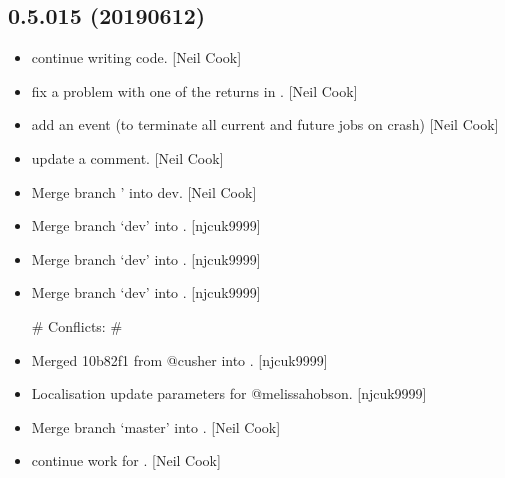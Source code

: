 \documentclass[a4paper,10pt,english]{report}
\begin{document}
\subsection{0.5.015 (2019\sphinxhyphen{}06\sphinxhyphen{}12)}
\label{\detokenize{misc/changelog:id141}}\begin{itemize}
\item {} 
 \sphinxhyphen{} continue writing code. {[}Neil Cook{]}

\item {} 
 \sphinxhyphen{} fix a problem with one of the returns in
. {[}Neil Cook{]}

\item {} 
 \sphinxhyphen{} add an event (to terminate all current and
future jobs on crash) {[}Neil Cook{]}

\item {} 
 \sphinxhyphen{} update a comment. {[}Neil Cook{]}

\item {} 
Merge branch ’ into dev. {[}Neil Cook{]}

\item {} 
Merge branch ‘dev’ into . {[}njcuk9999{]}

\item {} 
Merge branch ‘dev’ into . {[}njcuk9999{]}

\item {} 
Merge branch ‘dev’ into . {[}njcuk9999{]}

\# Conflicts:
\#    

\item {} 
 \sphinxhyphen{} Merged 10b82f1 from @cusher into . {[}njcuk9999{]}

\item {} 
Localisation \sphinxhyphen{} update parameters for @melissa\sphinxhyphen{}hobson. {[}njcuk9999{]}

\item {} 
Merge branch ‘master’ into . {[}Neil Cook{]}

\item {} 
 \sphinxhyphen{} continue work for . {[}Neil Cook{]}


\end{itemize}
\end{document}
